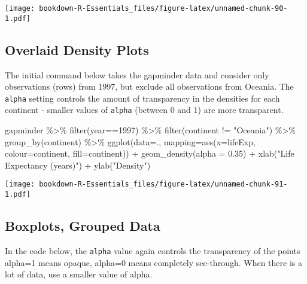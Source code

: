 \documentclass[
]{book}
\newenvironment{Shaded}{\begin{snugshade}}{\end{snugshade}}
\newcommand{\AttributeTok}[1]{\textcolor[rgb]{0.77,0.63,0.00}{#1}}
\newcommand{\DecValTok}[1]{\textcolor[rgb]{0.00,0.00,0.81}{#1}}
\newcommand{\FloatTok}[1]{\textcolor[rgb]{0.00,0.00,0.81}{#1}}
\newcommand{\FunctionTok}[1]{\textcolor[rgb]{0.00,0.00,0.00}{#1}}
\newcommand{\NormalTok}[1]{#1}
\newcommand{\SpecialCharTok}[1]{\textcolor[rgb]{0.00,0.00,0.00}{#1}}
\newcommand{\StringTok}[1]{\textcolor[rgb]{0.31,0.60,0.02}{#1}}
\begin{document}
\texttt{[image: bookdown-R-Essentials\_files/figure-latex/unnamed-chunk-90-1.pdf]}

\hypertarget{overlaid-density-plots}{%
\subsection{Overlaid Density Plots}\label{overlaid-density-plots}}

The initial command below takes the gapminder data and consider only observations (rows) from 1997, but exclude all observations from Oceania. The \texttt{alpha} setting controls the amount of transparency in the densities for each continent - smaller values of \texttt{alpha} (between 0 and 1) are more transparent.

\begin{Shaded}
\begin{Highlighting}[]
\NormalTok{gapminder }\SpecialCharTok{\%\textgreater{}\%} 
  \FunctionTok{filter}\NormalTok{(year}\SpecialCharTok{==}\DecValTok{1997}\NormalTok{) }\SpecialCharTok{\%\textgreater{}\%} 
  \FunctionTok{filter}\NormalTok{(continent }\SpecialCharTok{!=} \StringTok{"Oceania"}\NormalTok{) }\SpecialCharTok{\%\textgreater{}\%} 
  \FunctionTok{group\_by}\NormalTok{(continent) }\SpecialCharTok{\%\textgreater{}\%}
\FunctionTok{ggplot}\NormalTok{(}\AttributeTok{data=}\NormalTok{., }\AttributeTok{mapping=}\FunctionTok{aes}\NormalTok{(}\AttributeTok{x=}\NormalTok{lifeExp, }\AttributeTok{colour=}\NormalTok{continent, }\AttributeTok{fill=}\NormalTok{continent)) }\SpecialCharTok{+} 
  \FunctionTok{geom\_density}\NormalTok{(}\AttributeTok{alpha =} \FloatTok{0.35}\NormalTok{) }\SpecialCharTok{+} 
  \FunctionTok{xlab}\NormalTok{(}\StringTok{"Life Expectancy (years)"}\NormalTok{) }\SpecialCharTok{+}
  \FunctionTok{ylab}\NormalTok{(}\StringTok{"Density"}\NormalTok{)}
\end{Highlighting}
\end{Shaded}

\texttt{[image: bookdown-R-Essentials\_files/figure-latex/unnamed-chunk-91-1.pdf]}

\hypertarget{boxplots-grouped-data}{%
\subsection{Boxplots, Grouped Data}\label{boxplots-grouped-data}}

In the code below, the \texttt{alpha} value again controls the transparency of the points alpha=1 means opaque, alpha=0 means completely see-through. When there is a lot of data, use a smaller value of alpha.
\end{document}
